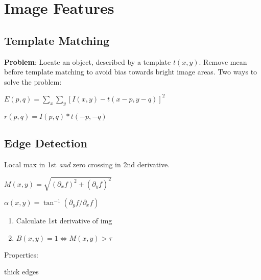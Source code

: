 \section{Image Features}

\subsection{Template Matching}
\textbf{Problem}: Locate an object, described by a template \(t(x, y)\).
{\color{H1}Remove mean before template matching to avoid bias towards bright image areas.}
Two ways to solve the problem:

\begin{definition}
  \(E(p, q) = \sum_{x} \sum_{y}[I(x, y) - t(x - p, y - q)]^2\)
\end{definition}

\begin{definition}
  \(r(p, q) = I(p, q) \ast t(-p, -q)\)
\end{definition}

\subsection{Edge Detection}

\begin{definition}[Edge]
  Local max in 1st \textit{and} zero crossing in 2nd derivative.
\end{definition}

\begin{definition}
  \(M(x, y) = \sqrt{\left(\partial_x f\right)^2 + \left(\partial_y f\right)^2}\)
\end{definition}

\begin{definition}
  \(\alpha(x, y) = \tan^{-1}\left(\partial_y f / \partial_x f\right)\)
\end{definition}

\begin{algorithm}
  \begin{enumerate}
    \item Calculate 1st derivative of img
    \item \(B(x, y) = 1 \iff M(x, y) > \tau\)
  \end{enumerate}

  Properties:
  \begin{itemize*}
    \item thick edges
  \end{itemize*}
\end{algorithm}

